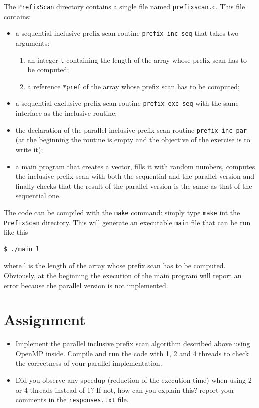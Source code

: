\documentclass{article}
\begin{document}
The \texttt{PrefixScan} directory contains a single file named
\texttt{prefixscan.c}.
This file contains:
\begin{itemize}
\item a sequential inclusive prefix scan routine
  \texttt{prefix\_inc\_seq} that takes two arguments:
  \begin{enumerate}
  \item an integer \texttt{l} containing the length of the array whose
    prefix scan has to be computed;
  \item a reference \texttt{*pref} of the array whose
    prefix scan has to be computed;
  \end{enumerate}
\item a sequential exclusive prefix scan routine
  \texttt{prefix\_exc\_seq} with the same
  interface as the inclusive routine;
\item the declaration of the parallel inclusive prefix scan routine
  \texttt{prefix\_inc\_par} (at the beginning the routine is empty and
  the objective of the exercise is to write it);
\item a main program that creates a vector, fills it with random
  numbers, computes the inclusive prefix scan with both the sequential
  and the parallel version and finally checks that the result of the
  parallel version is the same as that of the sequential one.
\end{itemize}

The code can be compiled with the \texttt{make} command: simply type
\texttt{make} int the \texttt{PrefixScan} directory. This will
generate an executable \texttt{main} file that can be run like this
\begin{verbatim}
$ ./main l
\end{verbatim}
where l is the length of the array whose prefix scan has to be
computed. Obviously, at the beginning the execution of the main
program will report an error because the parallel version is not
implemented.

\section{Assignment}
\begin{itemize}
\item {\huge \Keyboard} Implement the parallel inclusive prefix scan
  algorithm described above using OpenMP inside. Compile and run the code
  with 1, 2 and 4 threads to check the correctness of your parallel
  implementation.
\item \smallpencil Did you observe any speedup (reduction of the
  execution time) when using 2 or 4 threads instead of 1? If not, how can
  you explain this? report your comments in the \texttt{responses.txt}
  file.
\end{itemize}
\end{document}
